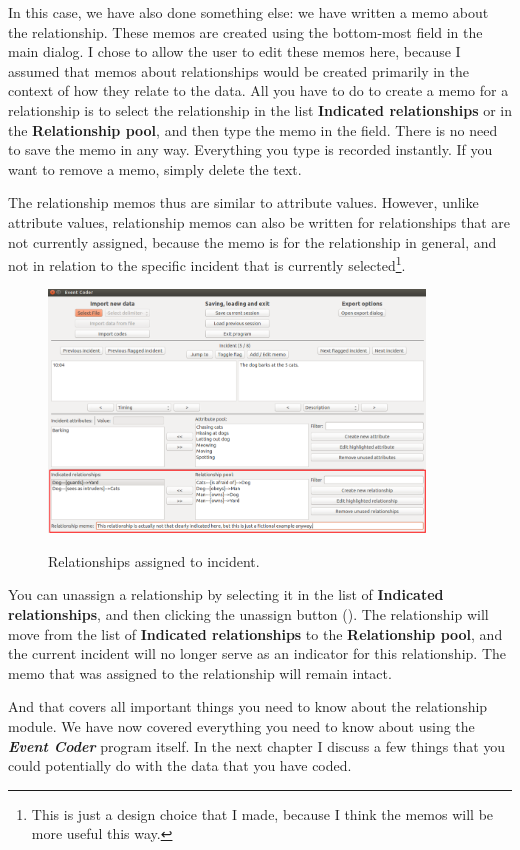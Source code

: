 \documentclass{memoir}
\begin{document}
In this case, we have also done something else: we have written a memo about the relationship. These memos are created using the bottom-most field in the main dialog. I chose to allow the user to edit these memos here, because I assumed that memos about relationships would be created primarily in the context of how they relate to the data. All you have to do to create a memo for a relationship is to select the relationship in the list \textbf{Indicated relationships} or in the \textbf{Relationship pool}, and then type the memo in the field. There is no need to save the memo in any way. Everything you type is recorded instantly. If you want to remove a memo, simply delete the text.

The relationship memos thus are similar to attribute values. However, unlike attribute values, relationship memos can also be written for relationships that are not currently assigned, because the memo is for the relationship in general, and not in relation to the specific incident that is currently selected\footnote{This is just a design choice that I made, because I think the memos will be more useful this way.}.

\begin{figure}[h!]
  \centering
  \caption{Relationships assigned to incident.}
  \includegraphics[width=100mm]{Screenshot_22.pdf}
  \label{fig:relationshipsassigned}
\end{figure}

You can unassign a relationship by selecting it in the list of \textbf{Indicated relationships}, and then clicking the unassign button (\textbf{\guillemotright}). The relationship will move from the list of \textbf{Indicated relationships} to the \textbf{Relationship pool}, and the current incident will no longer serve as an indicator for this relationship. The memo that was assigned to the relationship will remain intact.

And that covers all important things you need to know about the relationship module. We have now covered everything you need to know about using the \textbf{\emph{Event Coder}} program itself. In the next chapter I discuss a few things that you could potentially do with the data that you have coded. 
\end{document}
